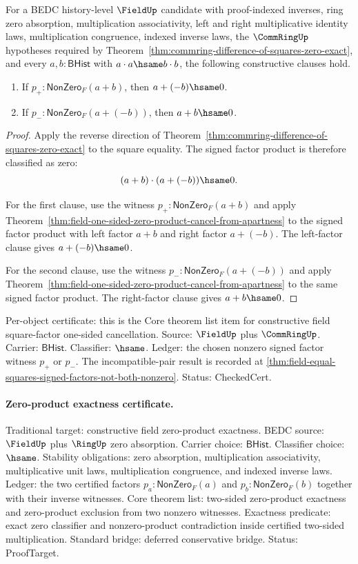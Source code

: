\begin{theorem}
\label{thm:field-equal-squares-signed-factor-exclusion}
For a BEDC history-level $\FieldUp$ candidate with proof-indexed inverses,
ring zero absorption, multiplication associativity, left and right
multiplicative identity laws, multiplication congruence, indexed inverse laws,
the $\CommRingUp$ hypotheses required by
Theorem~\ref{thm:commring-difference-of-squares-zero-exact}, and
every $a,b:\mathsf{BHist}$ with $a\cdot a\hsame b\cdot b$, the following
constructive clauses hold.
\begin{enumerate}
\item If $p_+:\mathsf{NonZero}_F(a+b)$, then $a+(-b)\hsame0$.
\item If $p_-:\mathsf{NonZero}_F(a+(-b))$, then $a+b\hsame0$.
\end{enumerate}
\end{theorem}
\begin{proof}
Apply the reverse direction of
Theorem~\ref{thm:commring-difference-of-squares-zero-exact} to the square
equality. The signed factor product is therefore classified as zero:
$$
(a+b)\cdot(a+(-b))\hsame0.
$$

For the first clause, use the witness $p_+:\mathsf{NonZero}_F(a+b)$ and
apply Theorem~\ref{thm:field-one-sided-zero-product-cancel-from-apartness} to
the signed factor product with left factor $a+b$ and right factor $a+(-b)$.
The left-factor clause gives
$a+(-b)\hsame0$.

For the second clause, use the witness $p_-:\mathsf{NonZero}_F(a+(-b))$ and
apply Theorem~\ref{thm:field-one-sided-zero-product-cancel-from-apartness} to
the same signed factor product. The right-factor clause gives $a+b\hsame0$.
\end{proof}

Per-object certificate: this is the Core theorem list item for constructive
field square-factor one-sided cancellation. Source: $\FieldUp$ plus
$\CommRingUp$. Carrier: $\mathsf{BHist}$. Classifier: $\hsame$. Ledger: the
chosen nonzero signed factor witness $p_+$ or $p_-$. The incompatible-pair
result is recorded at
\autoref{thm:field-equal-squares-signed-factors-not-both-nonzero}. Status:
CheckedCert.

\paragraph{Zero-product exactness certificate.}
Traditional target: constructive field zero-product exactness. BEDC source:
$\FieldUp$ plus $\RingUp$ zero absorption. Carrier choice:
$\mathsf{BHist}$. Classifier choice: $\hsame$. Stability obligations:
zero absorption, multiplication associativity, multiplicative unit laws,
multiplication congruence, and indexed inverse laws. Ledger: the two
certified factors $p_a:\mathsf{NonZero}_F(a)$ and
$p_b:\mathsf{NonZero}_F(b)$ together with their inverse witnesses. Core theorem
list: two-sided zero-product exactness and zero-product exclusion from two
nonzero witnesses. Exactness predicate: exact zero classifier and nonzero-product contradiction inside
certified two-sided multiplication. Standard bridge: deferred
conservative bridge. Status: ProofTarget.
